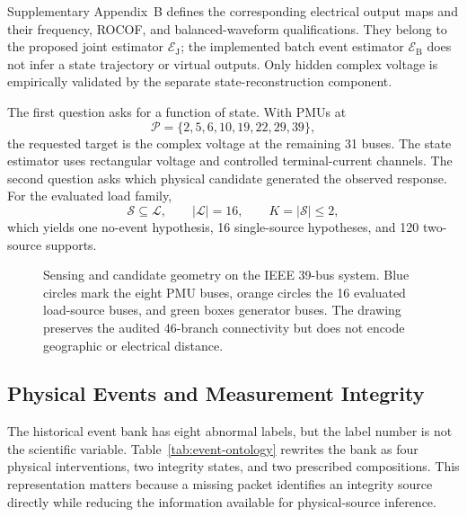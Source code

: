 Supplementary Appendix~B defines the corresponding electrical output maps and
their frequency, ROCOF, and balanced-waveform qualifications. They belong to
the proposed joint estimator $\mathcal E_{\mathrm J}$; the implemented batch
event estimator $\mathcal E_{\mathrm B}$ does not infer a state trajectory or
virtual outputs. Only hidden complex voltage is empirically validated by the
separate state-reconstruction component.

The first question asks for a function of state. With PMUs at
\begin{equation}
 \mathcal P=\{2,5,6,10,19,22,29,39\},
 \label{eq:pmu-set}
\end{equation}
the requested target is the complex voltage at the remaining 31 buses. The state estimator uses rectangular voltage and controlled terminal-current channels. The second question asks which physical candidate generated the observed response. For the evaluated load family,
\begin{equation}
 \mathcal S\subseteq\mathcal L,\qquad |\mathcal L|=16,\qquad
 K=|\mathcal S|\le2,
 \label{eq:sparse-load-support}
\end{equation}
which yields one no-event hypothesis, 16 single-source hypotheses, and 120 two-source supports.

\begin{figure}[t]
\centering
\resizebox{\textwidth}{!}{}
\caption{Sensing and candidate geometry on the IEEE 39-bus system. Blue circles mark the eight PMU buses, orange circles the 16 evaluated load-source buses, and green boxes generator buses. The drawing preserves the audited 46-branch connectivity but does not encode geographic or electrical distance.}
\label{fig:ieee39-topology}
\end{figure}

\subsection{Physical Events and Measurement Integrity}

The historical event bank has eight abnormal labels, but the label number is not the scientific variable. Table~\ref{tab:event-ontology} rewrites the bank as four physical interventions, two integrity states, and two prescribed compositions. This representation matters because a missing packet identifies an integrity source directly while reducing the information available for physical-source inference.

